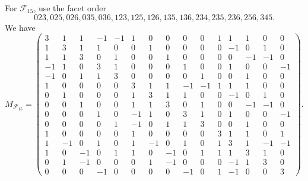 \documentclass[11pt]{article}
\newcommand{\calF}{\mathcal{F}}
\begin{document}
	For \(\calF_{15}\), use the facet order
	\[
	023,025,026,035,036,123,125,126,135,136,
	234,235,236,256,345.
	\]
We have
\begingroup
\normalsize
\setlength{\arraycolsep}{1.7pt}
\[
M_{\calF_{15}}=
\left(\begin{array}{*{15}{c}}
3& 1& 1&-1&-1& 1& 0& 0& 0& 0& 1& 1& 1& 0& 0\\
		1& 3& 1& 1& 0& 0& 1& 0& 0& 0& 0&-1& 0& 1& 0\\
		1& 1& 3& 0& 1& 0& 0& 1& 0& 0& 0& 0&-1&-1& 0\\
		-1& 1& 0& 3& 1& 0& 0& 0& 1& 0& 0& 1& 0& 0&-1\\
		-1& 0& 1& 1& 3& 0& 0& 0& 0& 1& 0& 0& 1& 0& 0\\
		1& 0& 0& 0& 0& 3& 1& 1&-1&-1& 1& 1& 1& 0& 0\\
		0& 1& 0& 0& 0& 1& 3& 1& 1& 0& 0&-1& 0& 1& 0\\
		0& 0& 1& 0& 0& 1& 1& 3& 0& 1& 0& 0&-1&-1& 0\\
		0& 0& 0& 1& 0&-1& 1& 0& 3& 1& 0& 1& 0& 0&-1\\
		0& 0& 0& 0& 1&-1& 0& 1& 1& 3& 0& 0& 1& 0& 0\\
		1& 0& 0& 0& 0& 1& 0& 0& 0& 0& 3& 1& 1& 0& 1\\
		1&-1& 0& 1& 0& 1&-1& 0& 1& 0& 1& 3& 1&-1&-1\\
		1& 0&-1& 0& 1& 1& 0&-1& 0& 1& 1& 1& 3& 1& 0\\
		0& 1&-1& 0& 0& 0& 1&-1& 0& 0& 0&-1& 1& 3& 0\\
		0& 0& 0&-1& 0& 0& 0& 0&-1& 0& 1&-1& 0& 0& 3
\end{array}\right).
\]
\endgroup
	
\end{document}
